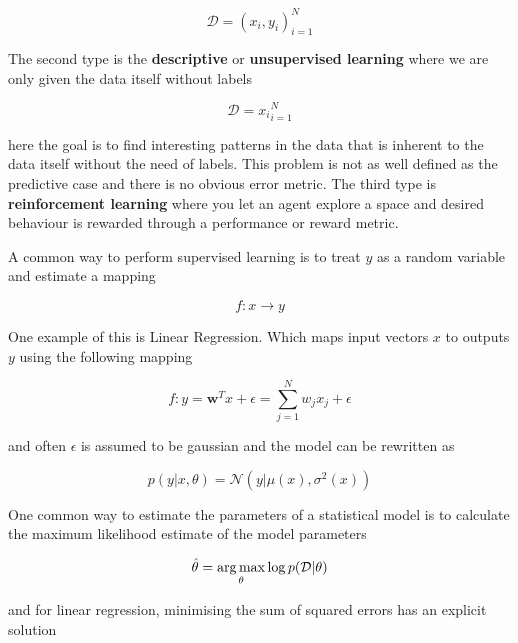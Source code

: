 \begin{equation*}
    \mathcal{D} = {(x_i, y_i)}_{i=1}^N
\end{equation*}

The second type is the \textbf{descriptive} or \textbf{unsupervised learning} where we are only given the data itself without labels

\begin{equation*}
    \mathcal{D} = {x_i}_{i=1}^N
\end{equation*}

here the goal is to find interesting patterns in the data that is inherent to the data itself without the need of labels. This problem is not as well defined as the predictive case and there is no obvious error metric. The third type is \textbf{reinforcement learning} where you let an agent explore a space and desired behaviour is rewarded through a performance or reward metric. 

A common way to perform supervised learning is to treat  $y$ as a random variable and estimate a mapping 

\begin{equation*}
    f: x \rightarrow y
\end{equation*}

One example of this is Linear Regression. Which maps input vectors $x$ to outputs $y$ using the following mapping \cite[p.~19]{Murphy:2012:Book}

\begin{equation*}
    f: y = \mathbf{w}^Tx + \epsilon = \sum_{j=1}^N w_j x_j + \epsilon
\end{equation*}

and often $\epsilon$ is assumed to be gaussian and the model can be rewritten as 

\begin{equation*}
    p(y|x, \theta) = \mathcal{N}(y|\mu(x), \sigma^2(x))
\end{equation*}

One common way to estimate the parameters of a statistical model is to calculate the maximum likelihood estimate of the model parameters \cite[p.~217]{Murphy:2012:Book}

\begin{equation*}
    \hat{\mathbf{\theta}} = \operatorname*{arg\,max}_{\theta} \log p(\mathcal{D}|\theta)
\end{equation*}

and for linear regression, minimising the sum of squared errors has an explicit solution \cite[p.~220]{Murphy:2012:Book}

